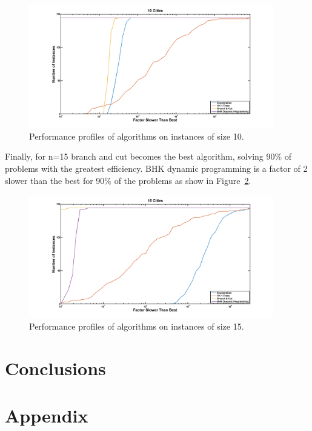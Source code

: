 \documentclass[11pt]{article}
\begin{document}
	\begin{figure}[H]
		\center
		\includegraphics[width=0.95\textwidth]{../performanceplots/perf10.png}
		\caption{Performance profiles of algorithms on instances of size 10.}
		\label{fig:perf-10}
	\end{figure}
	
	Finally, for n=15 branch and cut becomes the best algorithm, solving 90\% of problems with the greatest efficiency. BHK dynamic programming is a factor of 2 slower than the best for 90\% of the problems as show in Figure~\ref{fig:perf-15}. 
	
	\begin{figure}[H]
		\center
		\includegraphics[width=0.95\textwidth]{../performanceplots/perf15.png}
		\caption{Performance profiles of algorithms on instances of size 15.}
		\label{fig:perf-15}
	\end{figure}
	\section{Conclusions}
	\label{sec:conclusions}
	
	
	\nocite{*}
	
	
	
	\section*{Appendix}
\end{document}
